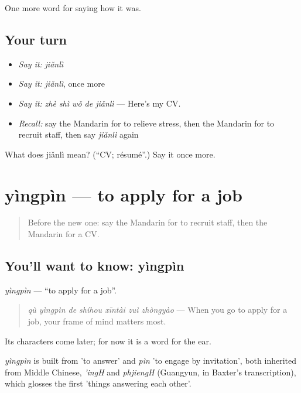 \begin{grammarlens}[title={What you've built}]
One more word for saying how it was.
\end{grammarlens}

\subsection*{Your turn}
\begin{itemize}
\raggedright
  \item \emph{Say it:} \emph{jiǎnlì}
  \item \emph{Say it:} \emph{jiǎnlì}, once more
  \item \emph{Say it:} \emph{zhè shì wǒ de jiǎnlì} — Here's my CV.
  \item \emph{Recall:} say the Mandarin for to relieve stress, then the Mandarin for to recruit staff, then say \emph{jiǎnlì} again
\end{itemize}

\begin{tcolorbox}[breakable,colback=teal!4,colframe=teal!35!black,title={Before you move on}]
What does jiǎnlì mean? (\textquotedblleft{}CV; résumé\textquotedblright{}.) Say it once more.
\end{tcolorbox}
\section[yìngpìn]{yìngpìn — to apply for a job}

\label{lesson:ZH-C486-yingpin}



\begin{quote}
Before the new one: say the Mandarin for to recruit staff, then the Mandarin for a CV.
\end{quote}

\subsection*{You'll want to know: yìngpìn}
\emph{yìngpìn} — \textquotedblleft{}to apply for a job\textquotedblright{}.

\begin{quote}
\emph{qù yìngpìn de shíhou xīntài zuì zhòngyào} — When you go to apply for a job, your frame of mind matters most.
\end{quote}

Its characters come later; for now it is a word for the ear.

\begin{cousinweb}
\emph{yìngpìn} is built from  'to answer' and \emph{pìn} 'to engage by invitation', both inherited from Middle Chinese, \emph{'ingH} and \emph{phjiengH} (Guangyun, in Baxter's transcription), which glosses the first 'things answering each other'.
\end{cousinweb}

